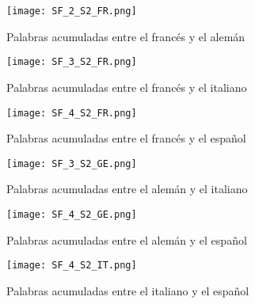 \begin{figure}[h!]
	\centering
	\texttt{[image: SF\_2\_S2\_FR.png]}
	\label{fig.SF_FG}
	\caption{Palabras acumuladas entre el francés y el alemán}
\end{figure}

\begin{figure}[h!]
	\centering
	\texttt{[image: SF\_3\_S2\_FR.png]}
	\label{fig.SF_FI}
	\caption{Palabras acumuladas entre el francés y el italiano}
\end{figure}

\begin{figure}[h!]
	\centering
	\texttt{[image: SF\_4\_S2\_FR.png]}
	\label{fig.SF_FS}
	\caption{Palabras acumuladas entre el francés y el español}
\end{figure}



\begin{figure}[h!]
	\centering
	\texttt{[image: SF\_3\_S2\_GE.png]}
	\label{fig.SF_GI}
	\caption{Palabras acumuladas entre el alemán y el italiano}
\end{figure}


\begin{figure}[h!]
	\centering
	\texttt{[image: SF\_4\_S2\_GE.png]}
	\label{fig.SF_GS}
	\caption{Palabras acumuladas entre el alemán y el español}
\end{figure}


\begin{figure}[h!]
	\centering
	\texttt{[image: SF\_4\_S2\_IT.png]}
	\label{fig.SF_IE}
	\caption{Palabras acumuladas entre el italiano y el español}
\end{figure}
